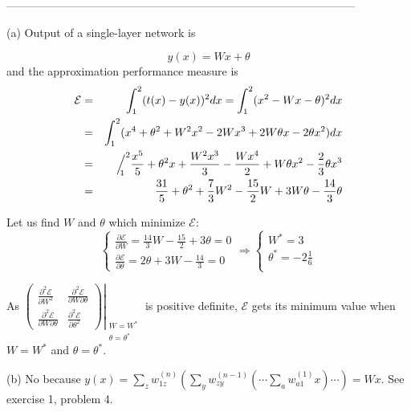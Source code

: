 \documentclass[10pt]{article}
\begin{document}
\begin{enumerate}
---------------------------------------------------------------------------------------------

(a) Output of a single-layer network is

\begin{equation*}
y(x)=Wx+\theta
\end{equation*}
and the approximation performance measure is
\begin{eqnarray*}
\mathcal{E}&=&\int_1^2(t(x)-y(x))^2 dx = \int_1^2
(x^2-Wx-\theta)^2dx\\
&=&\int_1^2 (x^4+\theta^2 +W^2x^2-2Wx^3+2W\theta x-2\theta x^2)dx\\
&=&\Big/^2_{\mspace{-11.0mu} 1} \frac{x^5}{5}
+\theta^2x+\frac{W^2x^3}{3}-\frac{Wx^4}{2}+W\theta x^2-\frac{2}{3}\theta x^3\\
&=&\frac{31}{5}+\theta^2 +\frac{7}{3}W^2-\frac{15}{2}W+3W\theta-\frac{14}{3}\theta
\end{eqnarray*}

Let us find $W$ and $\theta$ which minimize $\mathcal{E}$:
\begin{equation*}
\left\{\begin{array}{l}
\frac{\partial\mathcal{E}}{\partial
W}=\frac{14}{3}W-\frac{15}{2}+3\theta = 0\\
\frac{\partial\mathcal{E}}{\partial
\theta}=2\theta+3W -\frac{14}{3} = 0
\end{array}\right.
\Rightarrow
\left\{\begin{array}{l}
W^*=3\\
\theta^*=-2\frac{1}{6}\\
\end{array}\right.
\end{equation*}

As $\left.\begin{pmatrix} \frac{\partial^2\mathcal{E}}{\partial W^2} &
\frac{\partial^2\mathcal{E}}{\partial W \partial\theta}\\
\frac{\partial^2\mathcal{E}}{\partial W \partial\theta} &
\frac{\partial^2\mathcal{E}}{\partial\theta^2}
\end{pmatrix}\right|_{\begin{array}{l}\scriptstyle  W=W^*\\\theta=\theta^*\end{array}}$
is positive definite, $\mathcal{E}$ gets its minimum value when
$W=W^*$ and $\theta=\theta^*$.

\vspace{0.5cm}
(b) No because $y(x)=\sum_z w_{1z}^{(n)}\left(\sum_y
w_{zy}^{(n-1)}\left(\dotsm \sum_a w_{a1}^{(1)}x\right)\dotsm\right) = Wx$. See
exercise 1, problem 4.



\end{enumerate}
\end{document}
